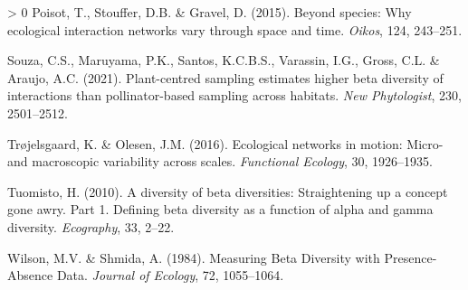 \documentclass[11pt]{article}
\newlength{\cslhangindent}
\newenvironment{CSLReferences}[3] %
 {%
  \setlength{\parindent}{0pt}
  \ifodd #1 \everypar{\setlength{\hangindent}{\cslhangindent}}\ignorespaces\fi
  \ifnum #2 > 0
  \setlength{\parskip}{#2\baselineskip}
  \fi
 }%
 {}
\begin{document}
\begin{CSLReferences}{1}{0}
\leavevmode\hypertarget{ref-Poisot2015SpeWhy}{}%
Poisot, T., Stouffer, D.B. \& Gravel, D. (2015). Beyond species: Why
ecological interaction networks vary through space and time.
\emph{Oikos}, 124, 243--251.

\leavevmode\hypertarget{ref-Souza2021PlaSam}{}%
Souza, C.S., Maruyama, P.K., Santos, K.C.B.S., Varassin, I.G., Gross,
C.L. \& Araujo, A.C. (2021). Plant-centred sampling estimates higher
beta diversity of interactions than pollinator-based sampling across
habitats. \emph{New Phytologist}, 230, 2501--2512.

\leavevmode\hypertarget{ref-Trojelsgaard2016EcoNet}{}%
Trøjelsgaard, K. \& Olesen, J.M. (2016). Ecological networks in motion:
Micro- and macroscopic variability across scales. \emph{Functional
Ecology}, 30, 1926--1935.

\leavevmode\hypertarget{ref-Tuomisto2010DivBet}{}%
Tuomisto, H. (2010). A diversity of beta diversities: Straightening up a
concept gone awry. Part 1. Defining beta diversity as a function of
alpha and gamma diversity. \emph{Ecography}, 33, 2--22.

\leavevmode\hypertarget{ref-Wilson1984MeaBet}{}%
Wilson, M.V. \& Shmida, A. (1984). Measuring Beta Diversity with
Presence-Absence Data. \emph{Journal of Ecology}, 72, 1055--1064.

\end{CSLReferences}
\end{document}
